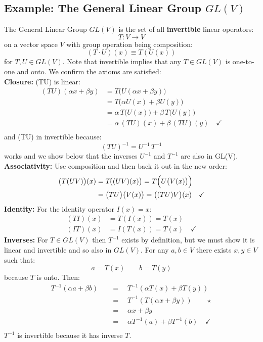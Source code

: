 \documentclass[12pt]{article}
\begin{document}
\subsection*{Example: The General Linear Group $GL(V)$}

The General Linear Group $GL(V)$ is the set of all {\bf invertible} linear operators:
$$T: V \to V$$
on a vector space $V$ with group operation being composition:
\begin{equation*}
  (T \cdot U)(x) \equiv T(U(x))
\end{equation*}
for $T,U \in GL(V)$.  Note that invertible implies that any
$T \in GL(V)$ is one-to-one and onto.  We confirm the axioms are
satisfied:\\[10pt]
\textbf{Closure:} (TU) is linear:
\begin{align*}
  (TU)(\alpha x + \beta y)
  &= T \bigl( U(\alpha x + \beta y) \bigr)\\
  &= T \bigl( \alpha U(x) + \beta U(y) \bigr) \\
  &= \alpha\, T\bigl(U(x)\bigl) + \beta\, T\bigl(U(y)\bigl) \\
  &= \alpha\, (TU) (x) + \beta\, (TU) (y) \quad \checkmark \\
\end{align*}
and (TU) in invertible because:
$$(TU)^{-1} = U^{-1} \, T^{-1}$$
works and we show below that the inverses $U^{-1}$ and $T^{-1}$ are also in GL(V).\\[5pt]
\textbf{Associativity:} Use composition and then back it out in the new order:
\begin{align*}
  \bigl(T(UV)\bigr)(x) &= T\!\bigl((UV)(x)\bigr)
  = T\Bigl(U\bigl(V(x)\bigr)\Bigr) \\
  &= \bigl(TU\bigr)\bigl(V(x)\bigr) = \bigl((TU)V\bigr)(x) \quad \checkmark
\end{align*}
\textbf{Identity:} For the identity operator $I(x) = x$:
\begin{align*}
  (TI)(x) &= T(I(x)) = T(x) \\
  (IT)(x) &= I(T(x)) = T(x) \quad \checkmark
\end{align*}
\textbf{Inverses:} For $T \in GL(V)$ then $T^{-1}$ exists by
definition, but we must show it is linear and invertible and so also
in $GL(V)$.  For any $a,b \in V$ there exists $x,y \in V$ such that:
$$a = T(x) \qquad b = T(y)$$
because $T$ is onto.  Then:
\begin{align*}
  T^{-1}(\alpha a + \beta b) \quad &= \quad T^{-1}(\alpha T(x) + \beta T(y))\\
  &= \quad T^{-1}(T(\alpha x + \beta y)) \qquad \star \\
  &= \quad \alpha x + \beta y \\
  &= \quad \alpha T^{-1}(a) + \beta T^{-1}(b) \quad \checkmark \\
\end{align*}
$T^{-1}$ is invertible because it has inverse $T$.
\end{document}
